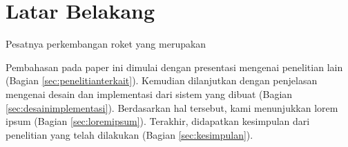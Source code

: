 \section{Latar Belakang}
\label{sec:latarbelakang}


Pesatnya perkembangan roket yang merupakan \lipsum[2-4]

Pembahasan pada paper ini dimulai dengan presentasi mengenai penelitian lain (Bagian \ref{sec:penelitianterkait}).
Kemudian dilanjutkan dengan penjelasan mengenai desain dan implementasi dari sistem yang dibuat (Bagian \ref{sec:desainimplementasi}).
Berdasarkan hal tersebut, kami menunjukkan lorem ipsum (Bagian \ref{sec:loremipsum}).
Terakhir, didapatkan kesimpulan dari penelitian yang telah dilakukan (Bagian \ref{sec:kesimpulan}).
